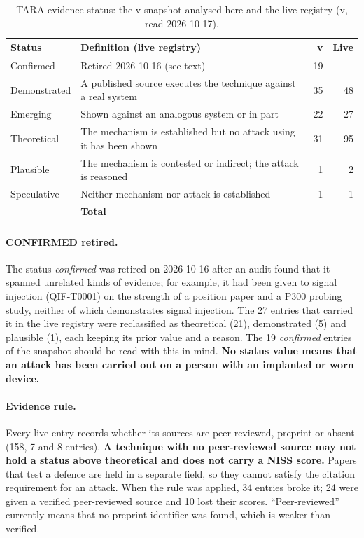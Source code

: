 \begin{table}[H]
\centering
\caption{TARA evidence status: the v\SnapshotRegistryVersion{} snapshot analysed here and
the live registry (v\LiveRegistryVersion{}, read 2026-10-17).}
\label{tab:status}
\small
\begin{tabularx}{\textwidth}{@{}l X r r@{}}
\toprule
\textbf{Status} & \textbf{Definition (live registry)} & \textbf{v\SnapshotRegistryVersion{}} & \textbf{Live} \\
\midrule
Confirmed    & Retired 2026-10-16 (see text)                                          & 19 & --- \\
Demonstrated & A published source executes the technique against a real system      & 35 & 48 \\
Emerging     & Shown against an analogous system or in part                         & 22 & 27 \\
Theoretical  & The mechanism is established but no attack using it has been shown   & 31 & 95 \\
Plausible    & The mechanism is contested or indirect; the attack is reasoned        & 1  & 2 \\
Speculative  & Neither mechanism nor attack is established                          & 1  & 1 \\
\midrule
             & \textbf{Total}                                                       & \SnapshotTechniques{} & \LiveTechniques{} \\
\bottomrule
\end{tabularx}
\end{table}

\paragraph{CONFIRMED retired.} The status \emph{confirmed} was retired on 2026-10-16
after an audit found that it spanned unrelated kinds of evidence; for example, it had been
given to signal injection (QIF-T0001) on the strength of a position paper and a P300
probing study, neither of which demonstrates signal injection. The 27 entries that carried
it in the live registry were reclassified as theoretical (21), demonstrated (5) and
plausible (1), each keeping its prior value and a reason. The 19 \emph{confirmed} entries of
the snapshot should be read with this in mind. \textbf{No status value means that an attack
has been carried out on a person with an implanted or worn device.}

\paragraph{Evidence rule.} Every live entry records whether its sources are peer-reviewed,
preprint or absent (158, 7 and 8 entries). \textbf{A technique with no peer-reviewed source
may not hold a status above theoretical and does not carry a NISS score.} Papers that test a
defence are held in a separate field, so they cannot satisfy the citation requirement for
an attack. When the rule was applied, 34 entries broke it; 24 were given a verified
peer-reviewed source and 10 lost their scores. ``Peer-reviewed'' currently means that no
preprint identifier was found, which is weaker than verified.

